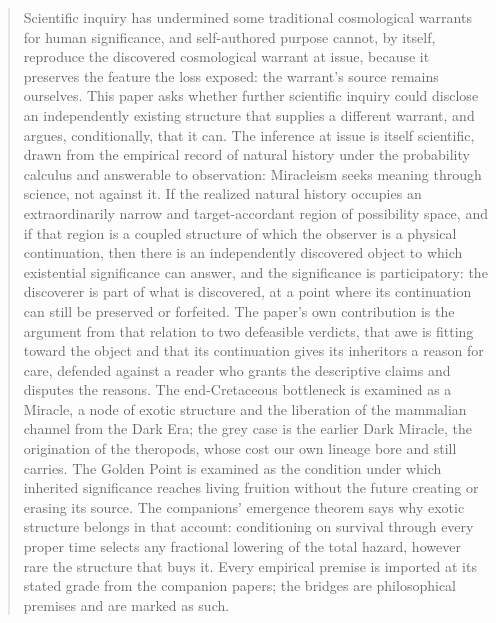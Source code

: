 \begin{abstract}
Scientific inquiry has undermined some traditional cosmological warrants for human significance, and self-authored purpose cannot, by itself, reproduce the discovered cosmological warrant at issue, because it preserves the feature the loss exposed: the warrant's source remains ourselves. This paper asks whether further scientific inquiry could disclose an independently existing structure that supplies a different warrant, and argues, conditionally, that it can. The inference at issue is itself scientific, drawn from the empirical record of natural history under the probability calculus and answerable to observation: Miracleism seeks meaning through science, not against it. If the realized natural history occupies an extraordinarily narrow and target-accordant region of possibility space, and if that region is a coupled structure of which the observer is a physical continuation, then there is an independently discovered object to which existential significance can answer, and the significance is participatory: the discoverer is part of what is discovered, at a point where its continuation can still be preserved or forfeited. The paper's own contribution is the argument from that relation to two defeasible verdicts, that awe is fitting toward the object and that its continuation gives its inheritors a reason for care, defended against a reader who grants the descriptive claims and disputes the reasons. The end-Cretaceous bottleneck is examined as a Miracle, a node of exotic structure and the liberation of the mammalian channel from the Dark Era; the grey case is the earlier Dark Miracle, the origination of the theropods, whose cost our own lineage bore and still carries. The Golden Point is examined as the condition under which inherited significance reaches living fruition without the future creating or erasing its source. The companions' emergence theorem says why exotic structure belongs in that account: conditioning on survival through every proper time selects any fractional lowering of the total hazard, however rare the structure that buys it. Every empirical premise is imported at its stated grade from the companion papers; the bridges are philosophical premises and are marked as such.

\end{abstract}
